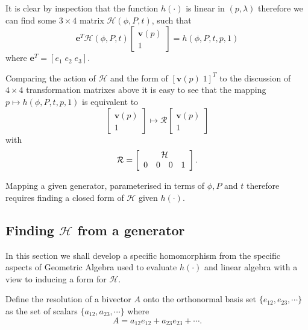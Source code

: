 It is clear by inspection that the function $h(\cdot)$ is linear in $(p,\lambda)$ 
therefore we can find some $3\times4$ matrix $\mathcal{H}(\phi, P, t)$, such that
\begin{equation}
\mathbf{e}^T 
 \mathcal{H}(\phi, P, t) \left[
\begin{array}{c}
\mathbf{v}(p) \\ 1
\end{array} 
\right] = h(\phi, P, t, p, 1) \label{eqn:hi}
\end{equation}
where $\mathbf{e}^T = \left[ e_1 \; e_2 \; e_3 \right]$.

Comparing the action of $\mathcal{H}$ and the form of $\left[ \mathbf{v}(p) \; 1 \right]^T$
to the discussion of $4\times4$ transformation matrixes above it is easy to
see that the mapping $p \mapsto h(\phi, P, t, p, 1)$ is equivalent to
\[
\left[
\begin{array}{c}
\mathbf{v}(p) \\ 1
\end{array} 
\right]
\mapsto
\mathcal{R}
\left[
\begin{array}{c}
\mathbf{v}(p) \\ 1
\end{array} 
\right]
\]
with
\[
\mathcal{R} = \left[
\begin{array}{cccc}
\multicolumn{4}{c}{\mathcal{H}} \\
                 0 & 0 & 0 & 1 
\end{array}
\right].
\]

Mapping a given generator, parameterised in terms of $\phi, P$ and $t$ therefore
requires finding a closed form of $\mathcal{H}$ given $h(\cdot)$.

\subsection{Finding $\mathcal{H}$ from a generator}

In this section we shall develop a specific homomorphism from the specific
aspects of Geometric Algebra used to evaluate $h(\cdot)$ and linear algebra with
a view to inducing a form for $\mathcal{H}$.

\begin{definition}
Define the resolution of a bivector $A$ onto the orthonormal basis
set $\{e_{12}, e_{23}, \cdots\}$ as the set of scalars $\{a_{12}, a_{23}, \cdots\}$ where
\[A = a_{12}e_{12} + a_{23}e_{23} + \cdots.\]
\end{definition}

